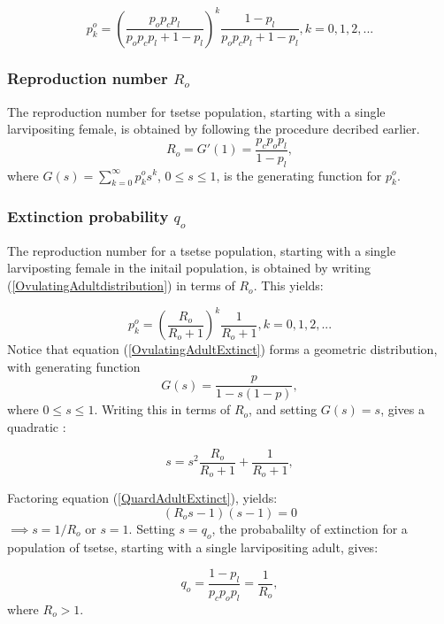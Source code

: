 \documentclass[smallextended]{svjour3}
\begin{document}
\begin{equation}
\label{OvulatingAdultdistribution}
p_{k}^{o} = (\frac{p_{o}p_{c}p_{l}}{p_{o}p_{c}p_{l} + 1 - p_{l}})^{k}\frac{1 - p_{l}}{p_{o}p_{c}p_{l} + 1 - p_{l}}, k =0,1,2,...
\end{equation}




\subsubsection{Reproduction number $R_{o}$}
The reproduction number for tsetse population, starting with a single larvipositing female, is obtained by following the procedure decribed earlier. 
\begin{equation}
\label{OvulatingadultreproductiveNum}
R_{o} = G'(1) = \frac{p_{c}p_{o}p_{l}}{1-p_{l}},
\end{equation}  
where $G(s) = \sum_{k=0}^{\infty} p_{k}^{o}s^{k}  $, $0\leq s \leq 1$, is the generating function for $p_{k}^{o}$.

\subsubsection{Extinction probability  $q_{o}$}

The reproduction number for a tsetse population, starting with a single larviposting female in the initail population, is obtained by writing  (\ref{OvulatingAdultdistribution}) in terms of  $R_{o}$. This yields:

\begin{equation}
\label{OvulatingAdultExtinct}
p_{k}^{o} = (\frac{R_{o}}{R_{o} + 1})^k\frac{1}{R_{o} + 1}, k =0,1,2,...
\end{equation}
Notice that equation (\ref{OvulatingAdultExtinct}) forms a geometric distribution, with generating function  $$G(s) = \frac{p}{1-s(1-p)}, $$ where $0\leq s \leq 1$. Writing this in terms of $R_o$, and setting $G(s)=s$, gives a quadratic :

\begin{equation}
\label{QuardAdultExtinct}
s =s^2\frac{R_{o}}{R_{o} + 1} + \frac{1}{R_{o} + 1} ,
\end{equation} 

Factoring equation (\ref{QuardAdultExtinct}), yields:
 $$(R_os-1)(s-1) = 0$$ $\implies s=1/R_o$ or $s=1$. Setting $s=q_o$,  the probabalilty of extinction for a population of tsetse, starting with a single larvipositing adult, gives: 


\begin{equation}
\label{extinctionYoungadult}
q_{o} = \frac{1-p_{l}}{p_{c}p_{o}p_{l}} = \frac{1}{R_{o}},
\end{equation}
where $R_o > 1$.
\end{document}

